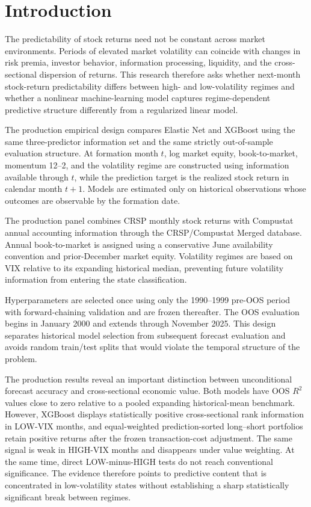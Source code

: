\section{Introduction}

The predictability of stock returns need not be constant across market environments. Periods of elevated market volatility can coincide with changes in risk premia, investor behavior, information processing, liquidity, and the cross-sectional dispersion of returns. This research therefore asks whether next-month stock-return predictability differs between high- and low-volatility regimes and whether a nonlinear machine-learning model captures regime-dependent predictive structure differently from a regularized linear model.

The production empirical design compares Elastic Net and XGBoost using the same three-predictor information set and the same strictly out-of-sample evaluation structure. At formation month $t$, log market equity, book-to-market, momentum 12--2, and the volatility regime are constructed using information available through $t$, while the prediction target is the realized stock return in calendar month $t+1$. Models are estimated only on historical observations whose outcomes are observable by the formation date.

The production panel combines CRSP monthly stock returns with Compustat annual accounting information through the CRSP/Compustat Merged database. Annual book-to-market is assigned using a conservative June availability convention and prior-December market equity. Volatility regimes are based on VIX relative to its expanding historical median, preventing future volatility information from entering the state classification.

Hyperparameters are selected once using only the 1990--1999 pre-OOS period with forward-chaining validation and are frozen thereafter. The OOS evaluation begins in January 2000 and extends through November 2025. This design separates historical model selection from subsequent forecast evaluation and avoids random train/test splits that would violate the temporal structure of the problem.

The production results reveal an important distinction between unconditional forecast accuracy and cross-sectional economic value. Both models have OOS $R^2$ values close to zero relative to a pooled expanding historical-mean benchmark. However, XGBoost displays statistically positive cross-sectional rank information in LOW-VIX months, and equal-weighted prediction-sorted long--short portfolios retain positive returns after the frozen transaction-cost adjustment. The same signal is weak in HIGH-VIX months and disappears under value weighting. At the same time, direct LOW-minus-HIGH tests do not reach conventional significance. The evidence therefore points to predictive content that is concentrated in low-volatility states without establishing a sharp statistically significant break between regimes.
